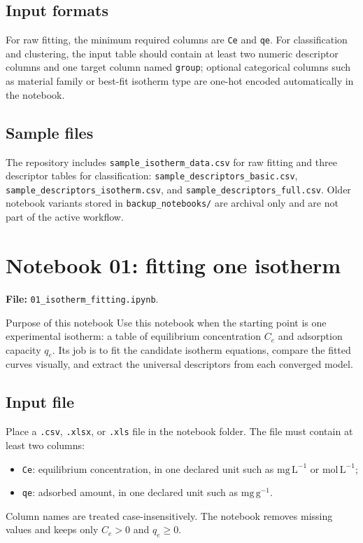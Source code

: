 \documentclass[journal=jacsat,manuscript=article]{achemso}
\begin{document}
\subsection{Input formats}
\label{sec:si_notebook_inputs}

For raw fitting, the minimum required columns are \texttt{Ce} and \texttt{qe}.
For classification and clustering, the input table should contain at least two
numeric descriptor columns and one target column named \texttt{group}; optional
categorical columns such as material family or best-fit isotherm type are
one-hot encoded automatically in the notebook.

\subsection{Sample files}
\label{sec:si_notebook_samples}

The repository includes \texttt{sample\_isotherm\_data.csv} for raw fitting and
three descriptor tables for classification:
\texttt{sample\_descriptors\_basic.csv},
\texttt{sample\_descriptors\_isotherm.csv}, and
\texttt{sample\_descriptors\_full.csv}. Older notebook variants stored in
\texttt{backup\_notebooks/} are archival only and are not part of the active
workflow.

\appendix

\section{Notebook 01: fitting one isotherm}
\label{app:si_notebook_01}

\noindent\textbf{File:} \texttt{01\_isotherm\_fitting.ipynb}.

\begin{bluebox}{Purpose of this notebook}
	Use this notebook when the starting point is one experimental isotherm:
	a table of equilibrium concentration \(C_e\) and adsorption capacity
	\(q_e\). Its job is to fit the candidate isotherm equations, compare
	the fitted curves visually, and extract the universal descriptors from
	each converged model.
\end{bluebox}

\subsection*{Input file}

Place a \texttt{.csv}, \texttt{.xlsx}, or \texttt{.xls} file in the notebook
folder. The file must contain at least two columns:
\begin{itemize}
	\item \texttt{Ce}: equilibrium concentration, in one declared unit such as
	\(\mathrm{mg\,L^{-1}}\) or \(\mathrm{mol\,L^{-1}}\);
	\item \texttt{qe}: adsorbed amount, in one declared unit such as
	\(\mathrm{mg\,g^{-1}}\).
\end{itemize}
Column names are treated case-insensitively. The notebook removes missing
values and keeps only \(C_e>0\) and \(q_e\geq 0\).
\end{document}
